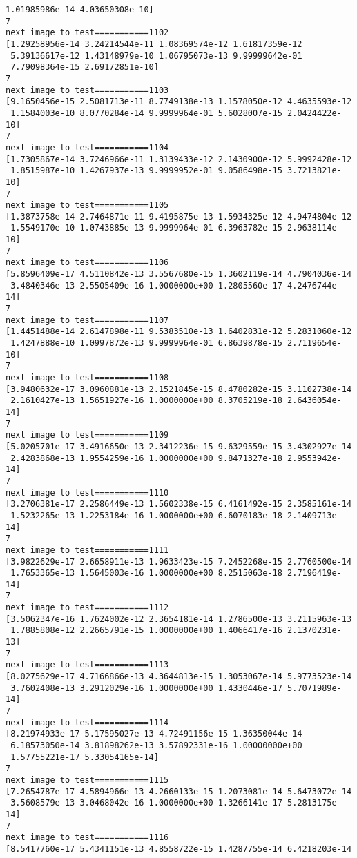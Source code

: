 \documentclass[11pt]{article}
\begin{document}
\begin{Verbatim}[commandchars=\\\{\}]
 1.01985986e-14 4.03650308e-10]
7
next image to test===========1102
[1.29258956e-14 3.24214544e-11 1.08369574e-12 1.61817359e-12
 5.39136617e-12 1.43148979e-10 1.06795073e-13 9.99999642e-01
 7.79098364e-15 2.69172851e-10]
7
next image to test===========1103
[9.1650456e-15 2.5081713e-11 8.7749138e-13 1.1578050e-12 4.4635593e-12
 1.1584003e-10 8.0770284e-14 9.9999964e-01 5.6028007e-15 2.0424422e-10]
7
next image to test===========1104
[1.7305867e-14 3.7246966e-11 1.3139433e-12 2.1430900e-12 5.9992428e-12
 1.8515987e-10 1.4267937e-13 9.9999952e-01 9.0586498e-15 3.7213821e-10]
7
next image to test===========1105
[1.3873758e-14 2.7464871e-11 9.4195875e-13 1.5934325e-12 4.9474804e-12
 1.5549170e-10 1.0743885e-13 9.9999964e-01 6.3963782e-15 2.9638114e-10]
7
next image to test===========1106
[5.8596409e-17 4.5110842e-13 3.5567680e-15 1.3602119e-14 4.7904036e-14
 3.4840346e-13 2.5505409e-16 1.0000000e+00 1.2805560e-17 4.2476744e-14]
7
next image to test===========1107
[1.4451488e-14 2.6147898e-11 9.5383510e-13 1.6402831e-12 5.2831060e-12
 1.4247888e-10 1.0997872e-13 9.9999964e-01 6.8639878e-15 2.7119654e-10]
7
next image to test===========1108
[3.9480632e-17 3.0960881e-13 2.1521845e-15 8.4780282e-15 3.1102738e-14
 2.1610427e-13 1.5651927e-16 1.0000000e+00 8.3705219e-18 2.6436054e-14]
7
next image to test===========1109
[5.0205701e-17 3.4916650e-13 2.3412236e-15 9.6329559e-15 3.4302927e-14
 2.4283868e-13 1.9554259e-16 1.0000000e+00 9.8471327e-18 2.9553942e-14]
7
next image to test===========1110
[3.2706381e-17 2.2586449e-13 1.5602338e-15 6.4161492e-15 2.3585161e-14
 1.5232265e-13 1.2253184e-16 1.0000000e+00 6.6070183e-18 2.1409713e-14]
7
next image to test===========1111
[3.9822629e-17 2.6658911e-13 1.9633423e-15 7.2452268e-15 2.7760500e-14
 1.7653365e-13 1.5645003e-16 1.0000000e+00 8.2515063e-18 2.7196419e-14]
7
next image to test===========1112
[3.5062347e-16 1.7624002e-12 2.3654181e-14 1.2786500e-13 3.2115963e-13
 1.7885808e-12 2.2665791e-15 1.0000000e+00 1.4066417e-16 2.1370231e-13]
7
next image to test===========1113
[8.0275629e-17 4.7166866e-13 4.3644813e-15 1.3053067e-14 5.9773523e-14
 3.7602408e-13 3.2912029e-16 1.0000000e+00 1.4330446e-17 5.7071989e-14]
7
next image to test===========1114
[8.21974933e-17 5.17595027e-13 4.72491156e-15 1.36350044e-14
 6.18573050e-14 3.81898262e-13 3.57892331e-16 1.00000000e+00
 1.57755221e-17 5.33054165e-14]
7
next image to test===========1115
[7.2654787e-17 4.5894966e-13 4.2660133e-15 1.2073081e-14 5.6473072e-14
 3.5608579e-13 3.0468042e-16 1.0000000e+00 1.3266141e-17 5.2813175e-14]
7
next image to test===========1116
[8.5417760e-17 5.4341151e-13 4.8558722e-15 1.4287755e-14 6.4218203e-14

\end{Verbatim}
\end{document}
